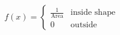 \documentclass[preview]{standalone}
\begin{document}
\begin{align*}
f(x) = \begin{cases} \frac{1}{\text{Area}} & \text{inside shape} \\ 0 & \text{outside} \end{cases}
\end{align*}
\end{document}
